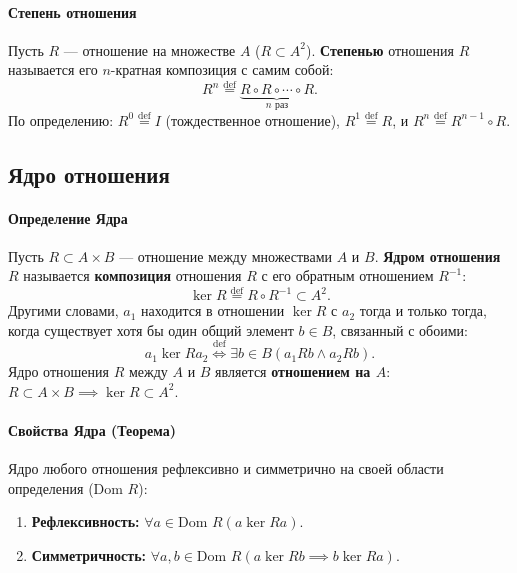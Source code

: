 \paragraph{Степень отношения}
Пусть $R$ --- отношение на множестве $A$ ($R \subset A^2$). \textbf{Степенью} отношения $R$ называется его $n$-кратная композиция с самим собой:
$$R^n \stackrel{\text{def}}{=} \underbrace{R \circ R \circ \cdots \circ R}_{n \text{ раз}}.$$
По определению: $R^0 \stackrel{\text{def}}{=} I$ (тождественное отношение), $R^1 \stackrel{\text{def}}{=} R$, и $R^n \stackrel{\text{def}}{=} R^{n-1} \circ R$.

\subsection*{Ядро отношения}

\paragraph{Определение Ядра}
Пусть $R \subset A \times B$ --- отношение между множествами $A$ и $B$.
\textbf{Ядром отношения} $R$ называется \textbf{композиция} отношения $R$ с его обратным отношением $R^{-1}$:
$$\ker R \stackrel{\text{def}}{=} R \circ R^{-1} \subset A^2.$$
Другими словами, $a_1$ находится в отношении $\ker R$ с $a_2$ тогда и только тогда, когда существует хотя бы один общий элемент $b \in B$, связанный с обоими:
$$a_1 \ker R a_2 \stackrel{\text{def}}{\iff} \exists b \in B (a_1 R b \land a_2 R b).$$
Ядро отношения $R$ между $A$ и $B$ является \textbf{отношением на $A$}: $R \subset A \times B \implies \ker R \subset A^2$.

\paragraph{Свойства Ядра (Теорема)}
Ядро любого отношения рефлексивно и симметрично на своей области определения ($\text{Dom } R$):
\begin{enumerate}
    \item \textbf{Рефлексивность:} $\forall a \in \text{Dom } R (a \ker R a)$.
    \item \textbf{Симметричность:} $\forall a, b \in \text{Dom } R (a \ker R b \implies b \ker R a)$.
\end{enumerate}

